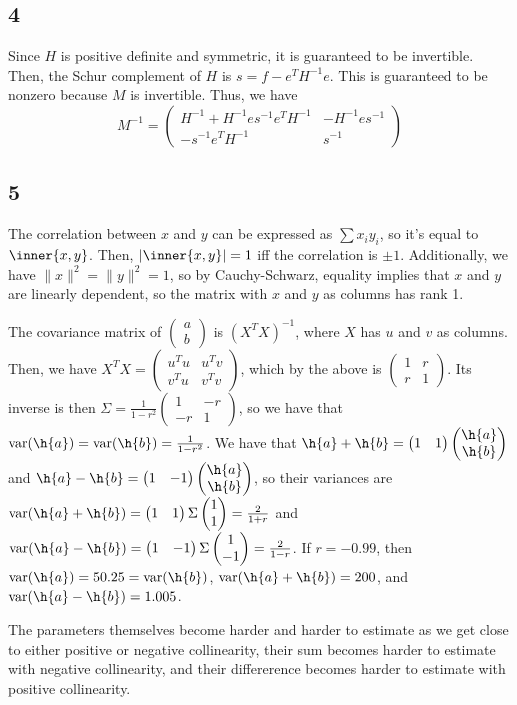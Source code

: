 \documentclass{article}
\newcommand{\openm}{\begin{pmatrix}}
\newcommand{\closem}{\end{pmatrix}}
\DeclareMathOperator{\var}{var}
\begin{document}
\subsection*{4}
Since $H$ is positive definite and symmetric, it is guaranteed to be invertible. Then, the Schur complement of $H$ is $s=f-e^TH^{-1}e$. This is guaranteed to be nonzero because $M$ is invertible. Thus, we have 
\[M^{-1}=\openm H^{-1}+H^{-1}es^{-1}e^TH^{-1}&-H^{-1}es^{-1}\\-s^{-1}e^TH^{-1}&s^{-1}\closem\]
\subsection*{5}
The correlation between $x$ and $y$ can be expressed as $\sum x_iy_i$, so it's equal to $\inner{x,y}$. Then, $|\inner{x,y}|=1$ iff the correlation is $\pm 1$. Additionally, we have $\|x\|^2=\|y\|^2=1$, so by Cauchy-Schwarz, equality implies that $x$ and $y$ are linearly dependent, so the matrix with $x$ and $y$ as columns has rank 1. 

The covariance matrix of $\openm a\\b\closem$ is $(X^TX)^{-1}$, where $X$ has $u$ and $v$ as columns. Then, we have $X^TX=\openm u^Tu&u^Tv\\v^Tu&v^Tv\closem$, which by the above is $\openm1&r\\r&1\closem$. Its inverse is then $\Sigma=\frac{1}{1-r^2}\openm1&-r\\-r&1\closem$, so we have that $\var(\h{a})=\var(\h{b})=\frac{1}{1-r^2}$. We have that $\h{a}+\h{b}=\openm1&1\closem\openm\h{a}\\\h{b}\closem$ and $\h{a}-\h{b}=\openm1&-1\closem\openm\h{a}\\\h{b}\closem$, so their variances are $\var(\h{a}+\h{b})=\openm1&1\closem\Sigma\openm1\\1\closem=\frac{2}{1+r}$ and $\var(\h{a}-\h{b})=\openm1&-1\closem\Sigma\openm1\\-1\closem=\frac{2}{1-r}$. If $r=-0.99$, then $\var(\h{a})=50.25=\var(\h{b})$,  $\var(\h{a}+\h{b})=200$, and $\var(\h{a}-\h{b})=1.005$. 

The parameters themselves become harder and harder to estimate as we get close to either positive or negative collinearity, their sum becomes harder to estimate with negative collinearity, and their differerence becomes harder to estimate with positive collinearity.
\end{document}
